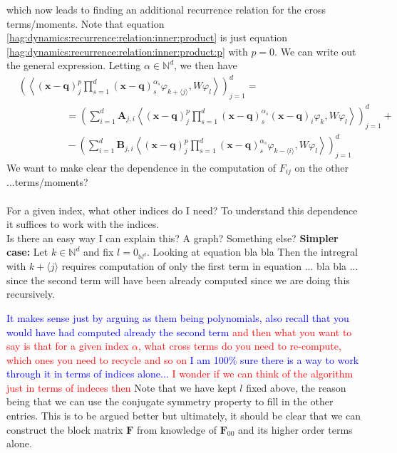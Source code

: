 which now leads to finding an additional recurrence relation 
for the cross terms/moments. 
Note that equation \eqref{hag:dynamics:recurrence:relation:inner:product}
is just equation \eqref{hag:dynamics:recurrence:relation:inner:product:p} 
with $p=0$. We can write out the general expression. Letting 
$\alpha \in \mathbb{N}^d$, we then have 
\begin{equation}
  \begin{split}
    &\left(
    \left \langle
      (\bm{x} - \bm{q})^{p}_{j}
      \prod_{s=1}^{d} (\bm{x} - \bm{q})^{\alpha_s}_{s} 
      \varphi_{k + \langle j \rangle}, W \varphi_{l}
  \right \rangle
\right)_{j=1}^d
=
\\
    &
    \hspace{2cm}
    =
    \left(
      \sum_{i=1}^d
     \bm{A}_{j,i} 
     \left \langle 
     (\bm{x} - \bm{q})^p_j
     \prod_{s=1}^{d} (\bm{x} - \bm{q})^{\alpha_s}_{s} 
     (\bm{x} - \bm{q})_{i}\varphi_k,
     W \varphi_l \right \rangle
    \right)_{j=1}^d +
    \\
    &
    \hspace{2cm}
    - \left(
      \sum_{i=1}^d
      \bm{B}_{j,i}
      \left \langle 
      (\bm{x}-\bm{q})_j^p
      \prod_{s=1}^{d} (\bm{x} - \bm{q})^{\alpha_s}_{s} 
      \varphi_{k - \langle i  \rangle}, 
      W \varphi_l \right \rangle
      \right)_{j=1}^d
\end{split}
\end{equation}
We want to make clear the dependence in the computation of $F_{ij}$ on the 
other ...terms/moments?\\\\
For a given index, what other indices do I need?
To understand this dependence it suffices to work with the indices.
\\ 
Is there an easy way I can explain this? A graph? Something else?
\textbf{Simpler case:} Let $k \in \mathbb{N}^d$ and fix $l = 0_{\mathbb{N}^d}$. 
Looking at equation bla bla 
Then the intregral with $k + \langle j \rangle$ requires computation of only 
the first term in equation ... bla bla ... since the second term 
will have been already computed since we are doing this recursively.  

\textcolor{blue}{It makes sense just by arguing as them being polynomials, also 
recall that you would have had computed already the second term}
\textcolor{red}{and then what you want to say is that for a given index $\alpha$, 
what cross terms do you need to re-compute, which ones you need to recycle and so on}
\textcolor{blue}{I am 100\% sure there is a way to work through it in terms 
of indices alone...}
\textcolor{red}{I wonder if we can think of the algorithm just in terms of indeces then}
Note that we have kept $l$ fixed above, the reason being that 
we can use the conjugate symmetry property to fill in the 
other entries.
This is to be argued better but ultimately, it should be 
clear that we can construct the block matrix $\bm{F}$ from 
knowledge of $\bm{F}_{00}$ and its higher order terms alone.

